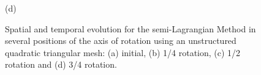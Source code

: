 \begin{figure}[H]
\begin{minipage}{.5\linewidth}
      (d)
     \end{minipage}
     \medskip
     \caption{
Spatial and temporal evolution for the semi-Lagrangian Method in several positions of the axis of rotation using an unstructured quadratic triangular mesh:	
     (a) initial, 
     (b) 1/4 rotation,
     (c) 1/2 rotation and
     (d) 3/4 rotation.}
     \label{SL quad fig}
\end{figure}

